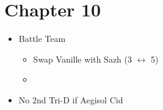 \chapter{Chapter 10}

	\begin{menu}
		\begin{itemize}
			\paradigm
			\begin{itemize}
				\item Battle Team
				      \begin{itemize}
					      \item Swap Vanille with Sazh (3 $\leftrightarrow$ 5)
					      \item {}%
					            {\paradigmline[1]{\textit{(\rav)}}{\textit{\sen}}{\textit{\syn}}}%
					            {\paradigmline{(\rav)}{\rav}{\rav}}%
					            {\paradigmline{(\rav)}{(\rav)}{\syn}}%
					            {\paradigmline{[\rav]}{(\rav)}{(\rav)}}%
					            {\paradigmline{\com}{\com}{[\rav]}}
				      \end{itemize}
				\item No 2nd Tri-D if Aegisol Cid
			\end{itemize}
		\end{itemize}
	\end{menu}
	
	\renewcommand{\first}{[1] Riot Shield (\rav/\sen/\syn)}
	\renewcommand{\second}{[2] Tri-Disaster (\rav/\rav/\rav)}
	\renewcommand{\third}{[3] Malevolence (\rav/\rav/\syn)}
	\renewcommand{\fourth}{[4] Tri-Disaster (\rav/\rav/\rav)}
	\renewcommand{\fifth}{[5] Aggression (\com/\com/\rav)}

